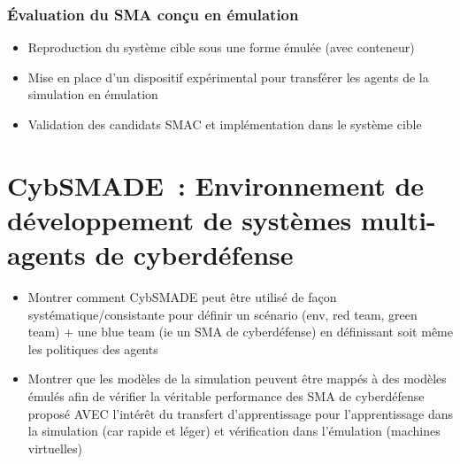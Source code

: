 \subsubsection{Évaluation du SMA conçu en émulation}
\begin{itemize}

    \item Reproduction du système cible sous une forme émulée (avec conteneur)
    \item Mise en place d'un dispositif expérimental pour transférer les agents de la simulation en émulation
    \item Validation des candidats SMAC et implémentation dans le système cible

\end{itemize}

\section{CybSMADE : Environnement de développement de systèmes multi-agents de cyberdéfense}\label{sec:cybSMAde}

\begin{itemize}

    \item Montrer comment CybSMADE peut être utilisé de façon systématique/consistante pour définir un scénario (env, red team, green team) + une blue team (ie un SMA de cyberdéfense) en définissant soit même les politiques des agents
    \item Montrer que les modèles de la simulation peuvent être mappés à des modèles émulés afin de vérifier la véritable performance des SMA de cyberdéfense proposé AVEC l'intérêt du transfert d'apprentissage pour l'apprentissage dans la simulation (car rapide et léger) et vérification dans l'émulation (machines virtuelles)
\end{itemize}